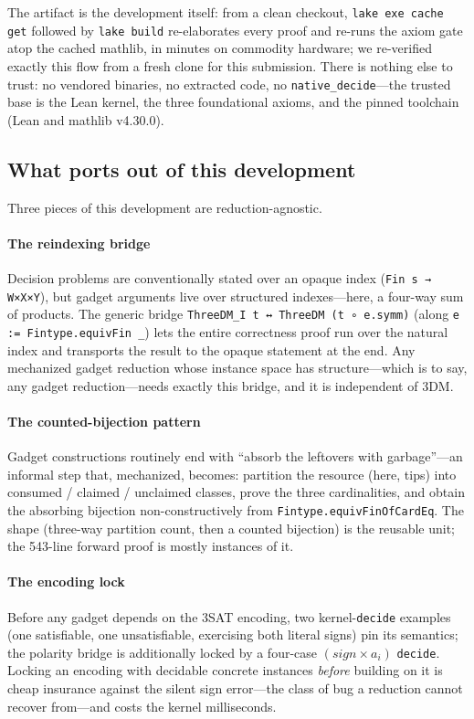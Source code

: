 \documentclass[sigplan,review,anonymous]{acmart}
\begin{document}
The artifact is the development itself: from a clean checkout, \lstinline{lake exe cache get} followed by
\lstinline{lake build} re-elaborates every proof and re-runs the axiom gate atop the cached mathlib, in minutes
on commodity hardware; we re-verified exactly this flow from a fresh clone for this submission. There is
nothing else to trust: no vendored binaries, no extracted code, no \lstinline{native_decide}---the trusted base
is the Lean kernel, the three foundational axioms, and the pinned toolchain (Lean and mathlib v4.30.0).

\subsection{What ports out of this development}\label{sec:portable}

Three pieces of this development are reduction-agnostic.

\paragraph{The reindexing bridge} Decision problems are conventionally stated over an opaque index
(\lstinline{Fin s → W×X×Y}), but gadget arguments live over structured indexes---here, a four-way sum of
products. The generic bridge \lstinline{ThreeDM_I t ↔ ThreeDM (t ∘ e.symm)} (along
\lstinline{e := Fintype.equivFin _}) lets the entire correctness proof run over the natural index and
transports the result to the opaque statement at the end. Any mechanized gadget reduction whose instance space
has structure---which is to say, any gadget reduction---needs exactly this bridge, and it is independent of
3DM.

\paragraph{The counted-bijection pattern} Gadget constructions routinely end with ``absorb the leftovers with
garbage''---an informal step that, mechanized, becomes: partition the resource (here, tips) into consumed /
claimed / unclaimed classes, prove the three cardinalities, and obtain the absorbing bijection
non-constructively from \lstinline{Fintype.equivFinOfCardEq}. The shape (three-way partition count, then a
counted bijection) is the reusable unit; the 543-line forward proof is mostly instances of it.

\paragraph{The encoding lock} Before any gadget depends on the 3SAT encoding, two kernel-\lstinline{decide}
examples (one satisfiable, one unsatisfiable, exercising both literal signs) pin its semantics; the polarity
bridge is additionally locked by a four-case $(\mathit{sign} \times a_i)$ \lstinline{decide}. Locking an
encoding with decidable concrete instances \emph{before} building on it is cheap insurance against the silent
sign error---the class of bug a reduction cannot recover from---and costs the kernel milliseconds.
\end{document}
